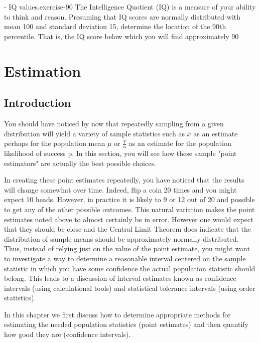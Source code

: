\documentclass[10pt,]{book}
\numberwithin{equation}{section}
\begin{document}
\begin{inlineexercise}{- IQ values.}{exercise-90}%
\hypertarget{p-1316}{}%
The Intelligence Quotient (IQ) is a measure of your ability to think and reason. Presuming that IQ scores are normally distributed with mean 100 and standard deviation 15, determine the location of the 90th percentile.  That is, the IQ score below which you will find approximately 90%
\end{inlineexercise}
%
%
\typeout{************************************************}
\typeout{************************************************}
%
\chapter[{Estimation}]{Estimation}\label{IntervalEstimation}
%
%
\typeout{************************************************}
\typeout{************************************************}
%
\section[{Introduction}]{Introduction}\label{section-65}
\hypertarget{p-1317}{}%
You should have noticed by now that repeatedly sampling from a given distribution will yield a variety of sample statistics such as \(\overline{x}\) as an estimate perhaps for the population mean \(\mu\) or \(\frac{Y}{n}\) as an estimate for the population likelihood of success p. In this section, you will see how these sample "point estimators" are actually the best possible choices.%
\par
\hypertarget{p-1318}{}%
In creating these point estimates repeatedly, you have noticed that the results will change somewhat over time. Indeed, flip a coin 20 times and you might expect 10 heads. However, in practice it is likely to 9 or 12 out of 20 and possible to get any of the other possible outcomes. This natural variation makes the point estimates noted above to almost certainly be in error. However one would expect that they should be close and the Central Limit Theorem does indicate that the distribution of sample means should be approximately normally distributed. Thus, instead of relying just on the value of the point estimate, you might want to investigate a way to determine a reasonable interval centered on the sample statistic in which you have some confidence the actual population statistic should belong. This leads to a discussion of interval estimates known as confidence intervals (using calculational tools) and statistical tolerance intervals (using order statistics).%
\par
\hypertarget{p-1319}{}%
In this chapter we first discuss how to determine appropriate methods for estimating the needed population statistics (point estimates) and then quantify how good they are (confidence intervals).%
%
%
\typeout{************************************************}
\typeout{************************************************}
%
\end{document}
